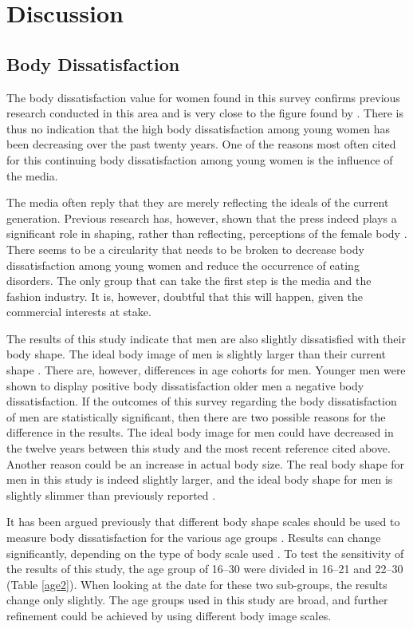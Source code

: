 \documentclass[a4paper, apacite, jou, 11pt]{apa6}
\begin{document}
\section{Discussion}
\label{sec:orgc304f84}
\subsection{Body Dissatisfaction}
\label{sec:orged0c7d2}
The body dissatisfaction value for women found in this survey confirms previous research conducted in this area and is very close to the figure found by . There is thus no indication that the high body dissatisfaction among young women has been decreasing over the past twenty years. One of the reasons most often cited for this continuing body dissatisfaction among young women is the influence of the media. 

The media often reply that they are merely reflecting the ideals of the current generation. Previous research has, however, shown that the press indeed plays a significant role in shaping, rather than reflecting, perceptions of the female body \cite{turner_influence_1997}. There seems to be a circularity that needs to be broken to decrease body dissatisfaction among young women and reduce the occurrence of eating disorders. The only group that can take the first step is the media and the fashion industry. It is, however, doubtful that this will happen, given the commercial interests at stake.

The results of this study indicate that men are also slightly dissatisfied with their body shape. The ideal body image of men is slightly larger than their current shape \cite{fallon_sex_1985,tiggeman_body-size_1992}. There are, however, differences in age cohorts for men. Younger men were shown to display positive body dissatisfaction older men a negative body dissatisfaction. If the outcomes of this survey regarding the body dissatisfaction of men are statistically significant, then there are two possible reasons for the difference in the results. The ideal body image for men could have decreased in the twelve years between this study and the most recent reference cited above. Another reason could be an increase in actual body size. The real body shape for men in this study is indeed slightly larger, and the ideal body shape for men is slightly slimmer than previously reported \cite{lamb_body_1993}.

It has been argued previously that different body shape scales should be used to measure body dissatisfaction for the various age groups \cite{byrne_should_1996}. Results can change significantly, depending on the type of body scale used \cite{tiggeman_body-size_1992}. To test the sensitivity of the results of this study, the age group of 16--30 were divided in 16--21 and 22--30 (Table \ref{age2}). When looking at the date for these two sub-groups, the results change only slightly. The age groups used in this study are broad, and further refinement could be achieved by using different body image scales.
\end{document}
